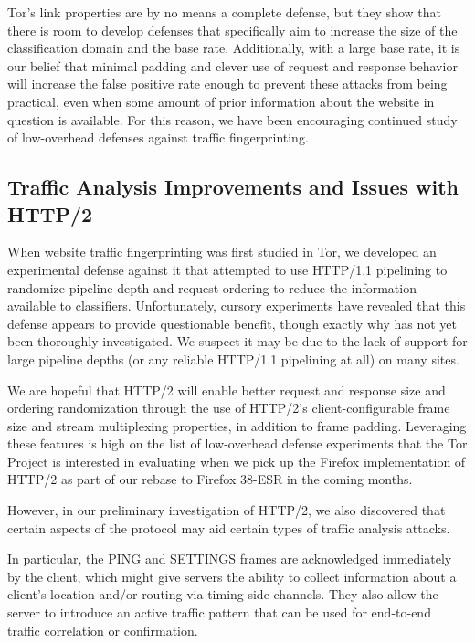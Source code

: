 \documentclass[letterpaper,11pt]{llncs}
\begin{document}
Tor's link properties are by no means a complete defense, but they show that
there is room to develop defenses that specifically aim to increase the size
of the classification domain and the base rate. Additionally, with a large
base rate, it is our belief that minimal padding and clever use of request and
response behavior will increase the false positive rate enough to prevent
these attacks from being practical, even when some amount of prior information
about the website in question is available. For this reason, we have been
encouraging continued study of low-overhead defenses against traffic
fingerprinting\cite{torbrowser-wtf}. 

\subsection{Traffic Analysis Improvements and Issues with HTTP/2}

When website traffic fingerprinting was first studied in Tor, we developed an
experimental defense against it that attempted to use HTTP/1.1 pipelining to
randomize pipeline depth and request ordering to reduce the information
available to classifiers\cite{blog-pipelining}. Unfortunately, cursory
experiments have revealed that this defense appears to provide questionable
benefit, though exactly why has not yet been thoroughly investigated. We
suspect it may be due to the lack of support for large pipeline depths (or
any reliable HTTP/1.1 pipelining at all) on many sites.

We are hopeful that HTTP/2 will enable better request and response size and
ordering randomization through the use of HTTP/2's client-configurable frame
size and stream multiplexing properties, in addition to frame padding.
Leveraging these features is high on the list of low-overhead defense
experiments that the Tor Project is interested in evaluating when we pick up
the Firefox implementation of HTTP/2 as part of our rebase to Firefox 38-ESR
in the coming months.

However, in our preliminary investigation of HTTP/2, we also discovered that
certain aspects of the protocol may aid certain types of traffic analysis
attacks.

In particular, the PING and SETTINGS frames are acknowledged immediately by
the client, which might give servers the ability to collect information about a
client's location and/or routing via timing side-channels. They also allow the
server to introduce an active traffic pattern that can be used for end-to-end
traffic correlation or confirmation.
\end{document}
